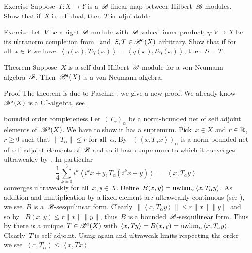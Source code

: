 \documentclass[b]{subfiles}
\begin{document}
\begin{parsec}
\begin{point}{Exercise}
Suppose~$T\colon X \to Y$ is a~$\mathscr{B}$-linear map between
    Hilbert~$\mathscr{B}$-modules.
Show that if~$X$ is self-dual,
    then~$T$ is adjointable.
\end{point}
\begin{point}{Exercise}%
Let~$V$ be a right $\mathscr{B}$-module with~$\mathscr{B}$-valued inner product;
    $\eta\colon V \to X$ be its ultranorm completion
    from~ and~$S,T \in \mathscr{B}^a(X)$ arbitrary.
Show that if for all~$x\in V$ we
have~$\left<\eta(x), T\eta(x)\right> = \left<\eta(x), S\eta(x)\right>$,
    then~$S=T$.
\end{point}
\begin{point}{Theorem}%
Suppose~$X$ is a self dual Hilbert~$\mathscr{B}$-module
    for a von Neumann algebra~$\mathscr{B}$.
Then~$\mathscr{B}^a(X)$ is a von Neumann algebra.
\begin{point}{Proof}%
The theorem is due to Paschke \cite[Prop.~3.10]{paschke};
    we give a new proof.
We already know~$\mathscr{B}^a(X)$ is a C$^*$-algebra, see .
\begin{point}{bounded order completeness}%
Let~$(T_\alpha)_\alpha$ be a norm-bounded net of self adjoint elements
    of~$\mathscr{B}^a(X)$.  We have to show it has a supremum.
Pick~$x\in X$ and  $r\in \mathbb{R}$, $r\geq0 $
such that~$\|T_\alpha\| \leq r$ for all~$\alpha$.
By ~$(\left<x,T_\alpha x\right>)_\alpha$
    is a norm-bounded net of self adjoint elements of~$\mathscr{B}$
    and so it has a supremum to which
    it converges ultraweakly by~.
In particular
\begin{equation*}
\frac{1}{4} \sum^3_{k=0} i^k \left< i^kx+y, T_\alpha(i^k x+y)\right>
    \ =\  \left<x, T_\alpha y\right>
\end{equation*}
converges ultraweakly for all~$x,y \in X$.
Define~$B(x,y) = \uwlim_\alpha \left<x,T_\alpha y\right>$.
As addition and multiplication by a fixed element are
    ultraweakly continuous (see ),
    we see~$B$ is a~$\mathscr{B}$-sesquilinear form.
Clearly~$\|\left<x,T_\alpha y\right>\| \leq r\|x\|\|y\|$
and so by ~$ B(x,y) \leq r \|x\|\|y\|$,
thus~$B$ is a bounded~$\mathscr{B}$-sesquilinear form.
Thus by 
    there is a unique~$T \in \mathscr{B}^a(X)$
    with~$\left<x,Ty\right> = B(x,y) = \uwlim_\alpha \left<x,T_\alpha y\right>$.
Clearly~$T$ is self adjoint.
Using  again and ultraweak limits respecting the order
    we see~$\left<x,T_\alpha\right> \leq \left<x,T x\right>$

\end{point}
\end{point}
\end{point}
\end{parsec}
\end{document}
